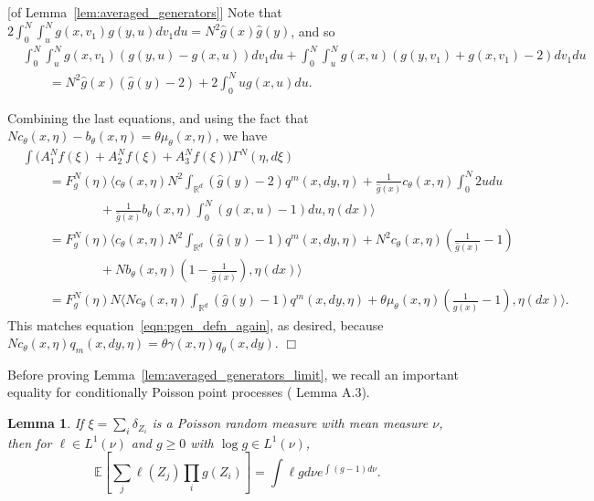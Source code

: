 \documentclass[12pt]{article}
\newenvironment {proof}{{\noindent\bf Proof }}{\hfill $\Box$ \medskip}
\newtheorem{lemma}[theorem]{Lemma}
\def \hat{\widehat}
\newcommand{\IE}{\mathbb E}
\newcommand{\IR}{\mathbb R}
\newcommand{\lp}{\xi}              %
\numberwithin{equation}{section}
\begin{document}
\begin{proof}[of Lemma~\ref{lem:averaged_generators}]
Note that $2 \int_0^N \int_u^N g(x,v_1) g(y,u) dv_1 du = N^2 \hat g(x) \hat g(y)$,
and so
\begin{align*}
&
    \int_{0}^{N} \int_u^N g(x,v_1) (g(y,u)-g(x,u)) dv_1 du
    + \int_{0}^{N} \int_u^N g(x,u) \left(g(y,v_1)+g(x,v_1)-2\right)dv_1 du
\\ &\qquad = 
    N^2 \hat{g}(x)(\hat{g}(y) - 2) + 2\int_{0}^{N} u g(x,u) du.
\end{align*}

Combining the last equations,
and using the fact that
$N c_\theta(x,\eta) - b_\theta(x,\eta) = \theta \mu_\theta(x,\eta)$,
we have 
\begin{align*}
&
    \int \Bigg( A^N_1 f(\xi) + A^N_2 f(\xi) + A^N_3 f(\xi) \Bigg) \Gamma^N(\eta,d\lp)
\\ &\qquad =
    F_g^N(\eta) \bigg\langle
        c_\theta(x,\eta) N^2 \int_{\IR^d} (\hat g(y) - 2) q^m(x,dy,\eta)
        +
        \frac{1}{\hat g(x)} c_\theta(x,\eta) \int_0^N 2u du
\\ &\qquad \qquad \qquad {}
        +
        \frac{1}{\hat g(x)} b_\theta(x,\eta) \int_0^N (g(x,u) - 1) du
    , \eta(dx) \bigg\rangle 
\\ &\qquad =
    F_g^N(\eta) \bigg\langle
        c_\theta(x,\eta) N^2 \int_{\IR^d} (\hat g(y) - 1) q^m(x,dy,\eta)
        +
        N^2 c_\theta(x,\eta) \left(\frac{1}{\hat g(x)} - 1\right)
\\ &\qquad \qquad \qquad {}
        +
        N b_\theta(x,\eta) \left(1 - \frac{1}{\hat g(x)}\right)
    , \eta(dx) \bigg\rangle 
\\ &\qquad =
    F_g^N(\eta) N \bigg\langle
        N c_\theta(x,\eta) \int_{\IR^d} (\hat g(y) - 1) q^m(x,dy,\eta)
        +
        \theta \mu_\theta(x,\eta) \left(\frac{1}{\hat g(x)} - 1\right)
    , \eta(dx) \bigg\rangle  .
\end{align*}
This matches equation~\eqref{eqn:pgen_defn_again}, as desired,
because $N c_\theta(x,\eta) q_m(x,dy,\eta) = \theta \gamma(x,\eta) q_\theta(x,dy)$.
\end{proof}

Before proving Lemma~\ref{lem:averaged_generators_limit},
we recall an important equality for conditionally
Poisson point processes (\cite{kurtz/rodrigues:2011} Lemma A.3).

\begin{lemma} \label{lem:poisson_eqn}
If $\lp = \sum_{i}\delta_{Z_i}$ is a Poisson random measure with mean measure $\nu$, 
then for $\ell \in L^{1}(\nu)$ and $g\geq0$ with $\log g \in L^{1}(\nu)$,
\begin{equation}
\IE\left[\sum_{j} \ell(Z_j) \prod_{i}g(Z_i)\right] = \int \ell g d\nu e^{\int (g-1) d \nu}.
\end{equation}
\end{lemma}
\end{document}
